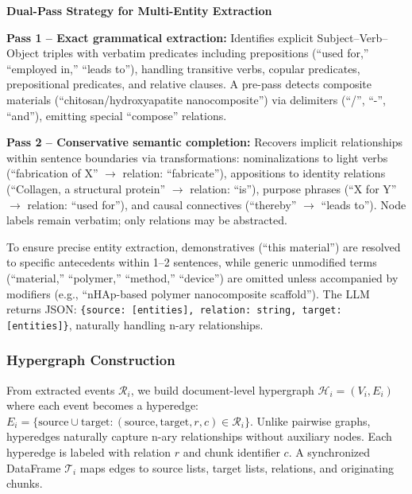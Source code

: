\documentclass{article}
\begin{document}
\begin{mdframed}[linewidth=1pt, linecolor=black!60, backgroundcolor=gray!5]
\textbf{Dual-Pass Strategy for Multi-Entity Extraction}

\medskip

\noindent\textbf{Pass 1 -- Exact grammatical extraction:} Identifies explicit Subject--Verb--Object triples with verbatim predicates including prepositions (``used for,'' ``employed in,'' ``leads to''), handling transitive verbs, copular predicates, prepositional predicates, and relative clauses. A pre-pass detects composite materials (``chitosan/hydroxyapatite nanocomposite'') via delimiters (``/'', ``-'', ``and''), emitting special ``compose'' relations.

\medskip

\noindent\textbf{Pass 2 -- Conservative semantic completion:} Recovers implicit relationships within sentence boundaries via transformations: nominalizations to light verbs (``fabrication of X'' $\to$ relation: ``fabricate''), appositions to identity relations (``Collagen, a structural protein'' $\to$ relation: ``is''), purpose phrases (``X for Y'' $\to$ relation: ``used for''), and causal connectives (``thereby'' $\to$ ``leads to''). Node labels remain verbatim; only relations may be abstracted.
\end{mdframed}

To ensure precise entity extraction, demonstratives (``this material'') are resolved to specific antecedents within 1--2 sentences, while generic unmodified terms (``material,'' ``polymer,'' ``method,'' ``device'') are omitted unless accompanied by modifiers (e.g., ``nHAp-based polymer nanocomposite scaffold''). The LLM returns JSON: \texttt{\{source: [entities], relation: string, target: [entities]\}}, naturally handling n-ary relationships.

\subsubsection{Hypergraph Construction}
From extracted events $\mathcal{R}_i$, we build document-level hypergraph $\mathcal{H}_i = (V_i, E_i)$ where each event becomes a hyperedge: $E_i = \{\text{source} \cup \text{target} : (\text{source}, \text{target}, r, c) \in \mathcal{R}_i\}$. Unlike pairwise graphs, hyperedges naturally capture n-ary relationships without auxiliary nodes. Each hyperedge is labeled with relation $r$ and chunk identifier $c$. A synchronized DataFrame $\mathcal{T}_i$ maps edges to source lists, target lists, relations, and originating chunks.
\end{document}

